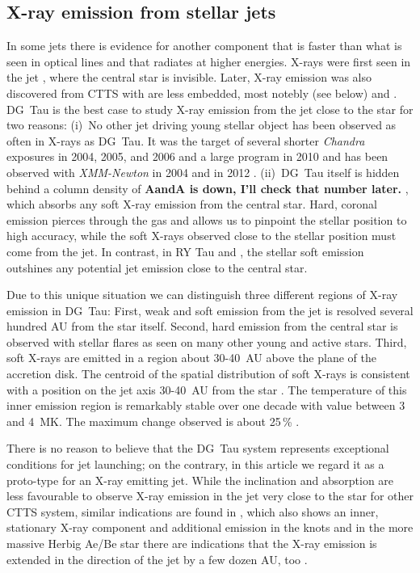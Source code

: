 \subsection{X-ray emission from stellar jets}
\label{sect:introxray}
In some jets there is evidence for another component that is faster than what is seen in optical lines and that radiates at higher energies. X-rays were first seen in the jet  \citep{2001Natur.413..708P,2012A&A...542A.123S}, where the central star is invisible. Later, X-ray emission was also discovered from CTTS with are less embedded, most notebly  (see below) and \citep{2014ApJ...788..101S}. DG~Tau is the best case to study X-ray emission from the jet close to the star for two reasons: (i)~No other jet driving young stellar object has been observed as often in X-rays as DG~Tau. It was the target of several shorter \emph{Chandra} exposures in 2004, 2005, and 2006 and a large program in 2010 \citep{2005ApJ...626L..53G,2008A&A...478..797G,2011ASPC..448..617G} and has been observed with \emph{XMM-Newton} in 2004 \citep{2007A&A...468..353G} and in 2012 \citep{SchneiderDGTauXray}. (ii)~DG~Tau itself is hidden behind a column density of \textbf{AandA is down, I'll check that number later.} \citep{2008A&A...478..797G}, which absorbs any soft X-ray emission from the central star. Hard, coronal emission pierces through the gas and allows us to pinpoint the stellar position to high accuracy, while the soft X-rays observed close to the stellar position must come from the jet. In contrast, in RY Tau and  \citep{2013A&A...552A.142G}, the stellar soft emission outshines any potential jet emission close to the central star.

Due to this unique situation we can distinguish three different regions of X-ray emission in DG~Tau: First, weak and soft emission from the jet is resolved several hundred AU from the star itself. Second, hard emission from the central star is observed with stellar flares as seen on many other young and active stars. Third, soft X-rays are emitted in a region about 30-40~AU above the plane of the accretion disk. The centroid of the spatial distribution of soft X-rays is consistent with a position on the jet axis 30-40~AU from the star \citep{2008A&A...488L..13S}. The temperature of this inner emission region is remarkably stable over one decade with value between 3 and 4~MK. The maximum change observed is about 25\,\% \citep{SchneiderDGTauXray}.

There is no reason to believe that the DG~Tau system represents exceptional conditions for jet launching; on the contrary, in this article we regard it as a proto-type for an X-ray emitting jet. While the inclination and absorption are less favourable to observe X-ray emission in the jet very close to the star for other CTTS system, similar indications are found in  , which also shows an inner, stationary X-ray component and additional emission in the knots \citep{2010A&A...511A..42B,2011A&A...530A.123S} and in the more massive Herbig Ae/Be star  there are indications that the X-ray emission is extended in the direction of the jet by a few dozen AU, too \citep{2005ApJ...628..811S,2013A&A...552A.142G}.

